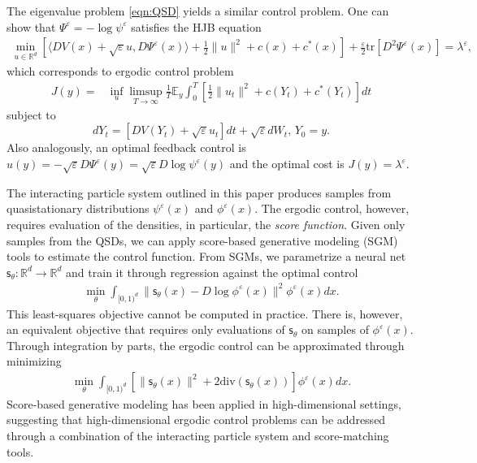 \documentclass[english,11pt]{article}%
\newcommand{\tr}{\text{tr}}
\numberwithin{equation}{section}
\numberwithin{example}{section}
\numberwithin{theorem}{section}
\begin{document}
The eigenvalue problem \eqref{eqn:QSD} yields a similar control problem. One can show that  $\Psi^\varepsilon = -\log \psi^\varepsilon$ satisfies the HJB equation
\begin{align}
    \min_{u\in \mathbb{R}^d} \left[  \langle D V(x) + \sqrt{\varepsilon} u,D\Psi^\varepsilon(x) \rangle   + \frac{1}{2}\|u\|^2+ c(x) + c^\ast(x)\right] + \frac{\varepsilon}{2}\tr[D^2 \Psi^\varepsilon(x)] = \lambda^\varepsilon,
\end{align}
which corresponds to ergodic control problem 
\begin{align}
    J(y) =  &\inf_{u} \limsup_{T \to \infty} \frac{1}{T} \mathbb{E}_y \int_0^T \left[\frac{1}{2} \|u_t\|^2 + c(Y_t) + c^\ast(Y_t) \right] dt 
  \end{align}  
  subject to 
\[
  dY_t = \left[ DV(Y_t) + \sqrt{\varepsilon}u_t \right] dt + \sqrt{\varepsilon}dW_t, \, Y_0 = y. 
  \]
Also analogously, an optimal feedback control is $u(y) = -\sqrt{\varepsilon} D\Psi^\varepsilon(y) = \sqrt{\varepsilon}D\log \psi^\varepsilon(y)$ and the optimal cost is $J(y) = \lambda^\varepsilon$.   

The interacting particle system outlined in this paper produces samples from quasistationary distributions $\psi^\varepsilon(x)$ and $\phi^\varepsilon(x)$. The ergodic control, however, requires evaluation of the densities, in particular, the \emph{score function}. Given only samples from the QSDs, we can apply score-based generative modeling (SGM) tools to estimate the control function. From SGMs, we parametrize a neural net $\mathsf{s}_\theta: \mathbb{R}^d \to \mathbb{R}^d$ and train it through regression against the optimal control
\begin{align}
    \min_\theta \int_{[0,1)^d} \|\mathsf{s}_\theta(x) - D\log \phi^\varepsilon(x) \|^2 \phi^\varepsilon(x) dx.
\end{align}
This least-squares objective cannot be computed in practice. There is, however, an equivalent objective that requires only evaluations of $\mathsf{s}_\theta$ on samples of $\phi^\varepsilon(x)$. Through integration by parts, the ergodic control can be approximated through minimizing
\begin{align}
    \min_\theta \int_{[0,1)^d} \left[ \|\mathsf{s}_\theta(x) \|^2  + 2 \text{div}( \mathsf{s}_\theta(x)) \right] \phi^\varepsilon(x)  dx.
\end{align}
Score-based generative modeling has been applied in high-dimensional settings, suggesting that high-dimensional ergodic control problems can be addressed through a combination of the interacting particle system and score-matching tools. 
\end{document}
